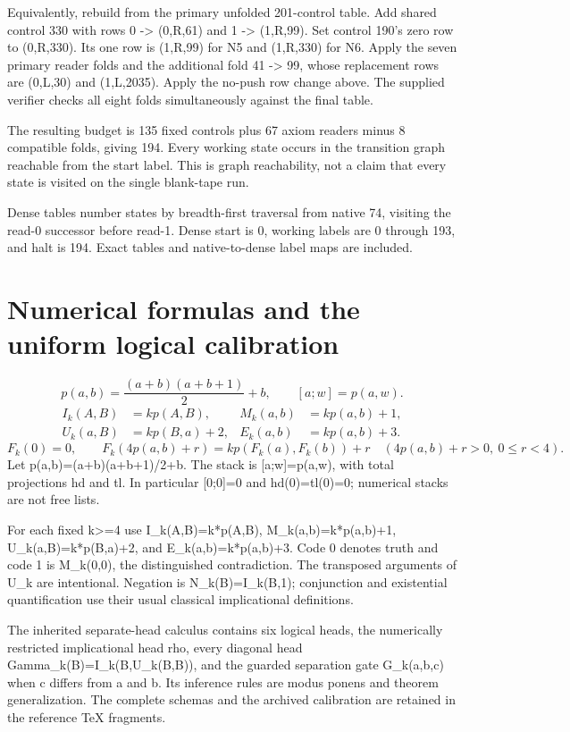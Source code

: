 \documentclass[11pt,letterpaper]{article}
\begin{document}
Equivalently, rebuild from the primary unfolded 201-control table. Add shared control 330 with rows 0 -> (0,R,61) and 1 -> (1,R,99). Set control 190's zero row to (0,R,330). Its one row is (1,R,99) for N5 and (1,R,330) for N6. Apply the seven primary reader folds and the additional fold 41 -> 99, whose replacement rows are (0,L,30) and (1,L,2035). Apply the no-push row change above. The supplied verifier checks all eight folds simultaneously against the final table.

The resulting budget is 135 fixed controls plus 67 axiom readers minus 8 compatible folds, giving 194. Every working state occurs in the transition graph reachable from the start label. This is graph reachability, not a claim that every state is visited on the single blank-tape run.

Dense tables number states by breadth-first traversal from native 74, visiting the read-0 successor before read-1. Dense start is 0, working labels are 0 through 193, and halt is 194. Exact tables and native-to-dense label maps are included.

\section{Numerical formulas and the uniform logical calibration}
\[
 p(a,b)=\frac{(a+b)(a+b+1)}2+b,\qquad [a;w]=p(a,w).
\]
\begin{align*}
 I_k(A,B)&=kp(A,B),&M_k(a,b)&=kp(a,b)+1,\\
 U_k(a,B)&=kp(B,a)+2,&E_k(a,b)&=kp(a,b)+3.
\end{align*}
\[
 F_k(0)=0,\qquad
 F_k(4p(a,b)+r)=kp(F_k(a),F_k(b))+r
 \quad(4p(a,b)+r>0,\ 0\leq r<4).
\]
Let p(a,b)=(a+b)(a+b+1)/2+b. The stack is [a;w]=p(a,w), with total projections hd and tl. In particular [0;0]=0 and hd(0)=tl(0)=0; numerical stacks are not free lists.

For each fixed k>=4 use I\_k(A,B)=k*p(A,B), M\_k(a,b)=k*p(a,b)+1, U\_k(a,B)=k*p(B,a)+2, and E\_k(a,b)=k*p(a,b)+3. Code 0 denotes truth and code 1 is M\_k(0,0), the distinguished contradiction. The transposed arguments of U\_k are intentional. Negation is N\_k(B)=I\_k(B,1); conjunction and existential quantification use their usual classical implicational definitions.

The inherited separate-head calculus contains six logical heads, the numerically restricted implicational head rho, every diagonal head Gamma\_k(B)=I\_k(B,U\_k(B,B)), and the guarded separation gate G\_k(a,b,c) when c differs from a and b. Its inference rules are modus ponens and theorem generalization. The complete schemas and the archived calibration are retained in the reference TeX fragments.
\end{document}
